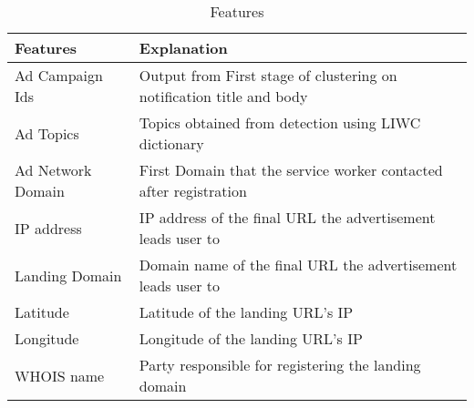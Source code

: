 \begin{table}[htbp]
\caption{Features }
\begin{center}
\label{features}
\begin{tabular}{p{2.5cm}|p{5.5cm}}
\toprule
\hline
 \textbf{Features} & \textbf{Explanation}
 \\
 \hline
 Ad Campaign Ids & Output from First stage of clustering on notification title and body 
 \\
  \hline
 Ad Topics & Topics obtained from detection  using LIWC dictionary
 \\
 \hline
 Ad Network Domain & First Domain that the service worker contacted after registration
 \\
  \hline
 IP address & IP address of the final URL the advertisement leads user to 
 \\
 \hline
 Landing Domain & Domain name of the final URL the advertisement leads user to 
 \\
 \hline
 Latitude & Latitude of the landing URL's IP
\\
\hline
 Longitude & Longitude of the landing URL's IP
\\
 \hline
 WHOIS name & Party responsible for registering the landing domain
 \\
 \hline
 \bottomrule
\end{tabular}
\end{center}
\end{table}